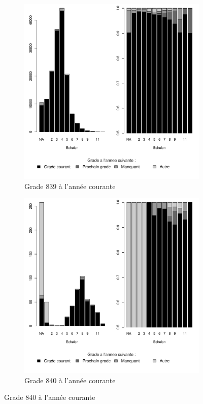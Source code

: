 \documentclass[11pt,a4paper]{article}
\begin{document}
\begin{figure}[ht] 
  \caption{Situation d'une année à l'autre, selon l'échelon}
  \label{evo_by_ech} 
  \begin{subfigure}[b]{0.5\linewidth}
      \caption{Grade 839 à l'année courante}
    \label{evo_by_ech_791} 
    \centering
    \includegraphics[width=1\linewidth]{AS_hazard_by_ech_839.pdf} 
  \end{subfigure}
  \begin{subfigure}[b]{0.5\linewidth}
        \caption{Grade 840 à l'année courante} 
    \label{evo_by_ech_792} 
    \centering
    \includegraphics[width=1\linewidth]{AS_hazard_by_ech_840.pdf} 
  \end{subfigure} 
\end{figure}
\end{document}
